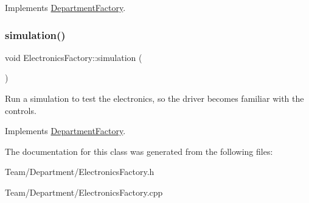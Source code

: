Implements \hyperlink{classDepartmentFactory_a41e5c96ee84f8237cb08d31cd782efae}{Department\+Factory}.

\mbox{\label{classElectronicsFactory_a5e3355480264038e7ec81b83bd73353a}} 
\subsubsection{\texorpdfstring{simulation()}{simulation()}}
{\footnotesize\ttfamily void Electronics\+Factory\+::simulation (\begin{DoxyParamCaption}{ }\end{DoxyParamCaption})\hspace{0.3cm}{\ttfamily [virtual]}}

Run a simulation to test the electronics, so the driver becomes familiar with the controls. 

Implements \hyperlink{classDepartmentFactory_ad7360e63135822e44031053723ff95fc}{Department\+Factory}.



The documentation for this class was generated from the following files\+:\begin{DoxyCompactItemize}
\item 
Team/\+Department/Electronics\+Factory.\+h\item 
Team/\+Department/Electronics\+Factory.\+cpp\end{DoxyCompactItemize}
